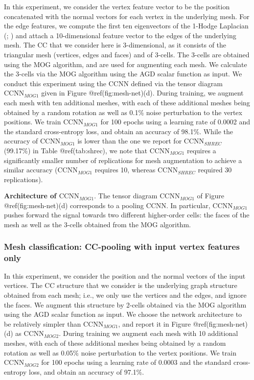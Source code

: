 \documentclass[
  12pt,
]{krantz}
\begin{document}
In this experiment, we consider the vertex feature vector to be the
position concatenated with the normal vectors for each vertex in the
underlying mesh. For the edge features, we compute the first ten
eigenvectors of the 1-Hodge Laplacian
(;
) and attach a
10-dimensional feature vector to the edges of the underlying mesh. The
CC that we consider here is 3-dimensional, as it consists of the
triangular mesh (vertices, edges and faces) and of 3-cells. The 3-cells
are obtained using the MOG algorithm, and are used for augmenting each
mesh. We calculate the 3-cells via the MOG algorithm using the AGD
scalar function as input. We conduct this experiment using the CCNN
defined via the tensor diagram \(\mbox{CCNN}_{MOG1}\) given in Figure
@ref(fig:mesh-net)(d). During training, we augment each mesh with ten
additional meshes, with each of these additional meshes being obtained
by a random rotation as well as 0.1\% noise perturbation to the vertex
positions. We train \(\mbox{CCNN}_{MOG1}\) for 100 epochs using a
learning rate of 0.0002 and the standard cross-entropy loss, and obtain
an accuracy of 98.1\%. While the accuracy of \(\mbox{CCNN}_{MOG1}\) is
lower than the one we report for \(\mbox{CCNN}_{SHREC}\) (99.17\%) in
Table @ref(tab:shrec), we note that \(\mbox{CCNN}_{MOG1}\) requires a
significantly smaller number of replications for mesh augmentation to
achieve a similar accuracy (\(\mbox{CCNN}_{MOG1}\) requires 10, whereas
\(\mbox{CCNN}_{SHREC}\) required 30 replications).

\textbf{Architecture of \(\mbox{CCNN}_{MOG1}\)}. The tensor diagram
\(\mbox{CCNN}_{MOG1}\) of Figure @ref(fig:mesh-net)(d) corresponds to a
pooling CCNN. In particular, \(\mbox{CCNN}_{MOG1}\) pushes forward the
signal towards two different higher-order cells: the faces of the mesh
as well as the 3-cells obtained from the MOG algorithm.

\subsubsection{Mesh classification: CC-pooling with input vertex
features
only}\label{mesh-classification-cc-pooling-with-input-vertex-features-only}

In this experiment, we consider the position and the normal vectors of
the input vertices. The CC structure that we consider is the underlying
graph structure obtained from each mesh; i.e., we only use the vertices
and the edges, and ignore the faces. We augment this structure by
2-cells obtained via the MOG algorithm using the AGD scalar function as
input. We choose the network architecture to be relatively simpler than
\(\mbox{CCNN}_{MOG1}\), and report it in Figure @ref(fig:mesh-net)(d) as
\(\mbox{CCNN}_{MOG2}\). During training we augment each mesh with 10
additional meshes, with each of these additional meshes being obtained
by a random rotation as well as 0.05\% noise perturbation to the vertex
positions. We train \(\mbox{CCNN}_{MOG2}\) for 100 epochs using a
learning rate of 0.0003 and the standard cross-entropy loss, and obtain
an accuracy of 97.1\%.
\end{document}
